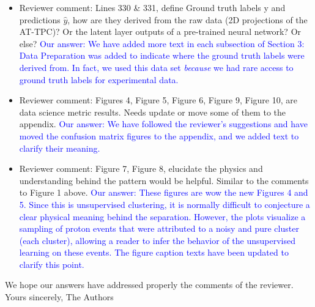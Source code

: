 \documentclass[12pt]{article}
\begin{document}
\begin{itemize}
\item Reviewer comment: Lines 330 \& 331, define Ground truth labels y and predictions $\hat{y}$, how are they derived from
the raw data (2D projections of the AT-TPC)? Or the latent layer outputs of a pre-trained neural
network? Or else?
\textcolor{blue}{Our answer: We have added more text in each subsection of Section 3: Data Preparation was added to indicate where the ground truth labels were derived from. In fact, we used this data set {\it because} we had rare access to ground truth labels for experimental data.}
\item Reviewer comment: Figures 4, Figure 5, Figure 6, Figure 9, Figure 10, are data science metric results. Needs update or
move some of them to the appendix.
\textcolor{blue}{Our answer: We have followed the reviewer's suggestions and have moved the confusion matrix figures to the appendix, and we added text to clarify their meaning.}
\item Reviewer comment: Figure 7, Figure 8, elucidate the physics and understanding behind the pattern would be helpful.
Similar to the comments to Figure 1 above.
\textcolor{blue}{Our answer: These figures are wow the new Figures 4 and 5. Since this is unsupervised clustering, it is normally difficult to  conjecture a clear   physical meaning behind the separation. However, the plots visualize a sampling of proton events that were attributed to a noisy and pure cluster (each cluster), allowing a reader to infer the behavior of the unsupervised learning on these events. The figure caption texts have been updated to clarify this point. }
\end{itemize}

We hope our answers have addressed properly the comments of the reviewer. \newline
Yours sincerely,\newline
The Authors
\end{document}
